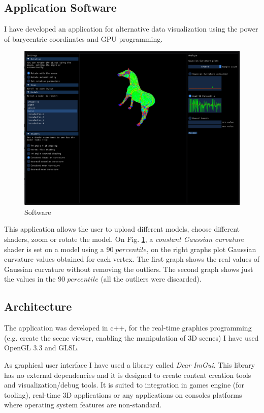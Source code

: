 \subsection{Application Software}
I have developed an application for alternative data visualization using the power of barycentric coordinates and GPU programming.
\begin{figure}[!h]
    \includegraphics[scale=0.4]{images/program.png}
    \caption{Software}
    \label{fig:software}
\end{figure}
This application allows the user to upload different models, choose different shaders, zoom or rotate the model.
On Fig. \ref{fig:software}, a \textit{constant Gaussian curvature} shader is set on a model using a $90 \; percentile$, on the right graphs plot Gaussian curvature values obtained for each vertex. The first graph shows the real values of Gaussian curvature without removing the outliers. The second graph shows just the values in the $90 \; percentile$ (all the outliers were discarded).

\subsection{Architecture}
The application was developed in c++, for the real-time graphics programming (e.g. create the scene viewer, enabling the manipulation of 3D scenes) I have used OpenGL $3.3$ and GLSL.

As graphical user interface I have used a library called \textit{Dear ImGui}. This library has no external dependencies and it is designed to create content creation tools and visualization/debug tools. It is suited to integration in games engine (for tooling), real-time 3D applications or any applications on consoles platforms where operating system features are non-standard.


